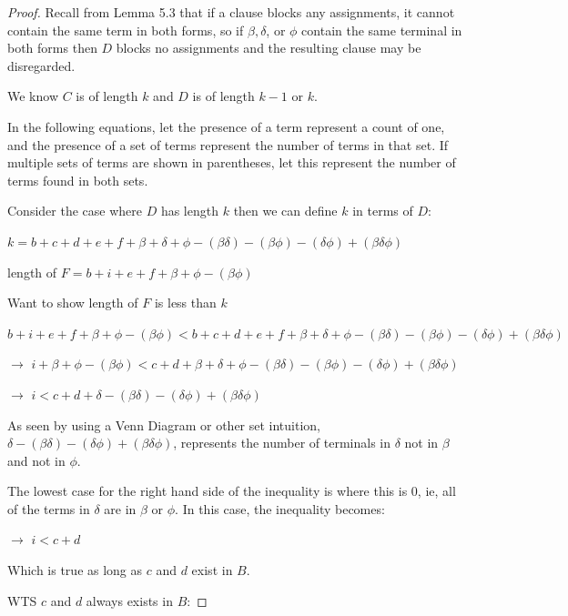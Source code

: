 \documentclass[manuscript]{acmart}
\begin{document}
\begin{proof}
        Recall from Lemma 5.3 that if a clause blocks any assignments, it cannot
        contain the same term in both forms, so if $\beta, \delta$, or $\phi$ contain
        the same terminal in both forms then $D$ blocks no assignments and the resulting
        clause may be disregarded.

        We know $C$ is of length $k$ and $D$ is of length $k - 1$ or $k$.

        In the following equations, let the presence of a term represent a count of one,
        and the presence of a set of terms represent the number of terms in that set. If
        multiple sets of terms are shown in parentheses, let this represent the number
        of terms found in both sets.

        Consider the case where $D$ has length $k$ then we can define $k$ in terms of $D$:
        
        $k = b + c + d + e + f + \beta + \delta + \phi - (\beta \delta) - 
        (\beta \phi) - (\delta \phi) + (\beta \delta \phi)$

        length of $F = b + i + e + f + \beta + \phi - (\beta \phi)$

        Want to show length of $F$ is less than $k$

        $b + i + e + f + \beta + \phi - (\beta \phi) < 
        b + c + d + e + f + \beta + \delta + \phi - (\beta \delta) - 
        (\beta \phi) - (\delta \phi) + (\beta \delta \phi)$

        $\rightarrow$ $i + \beta + \phi - (\beta \phi) < 
        c + d + \beta + \delta + \phi - (\beta \delta) - 
        (\beta \phi) - (\delta \phi) + (\beta \delta \phi)$

        $\rightarrow$ $i < 
        c + d + \delta - (\beta \delta) - (\delta \phi) + (\beta \delta \phi)$

        As seen by using a Venn Diagram or other set intuition, $\delta - 
        (\beta \delta) - (\delta \phi) + (\beta \delta \phi)$, 
        represents the number of terminals in $\delta$ not in $\beta$
        and not in $\phi$.

        The lowest case for the right hand side of the inequality is where 
        this is 0, ie, all of the terms in $\delta$ are in $\beta$ or 
        $\phi$. In this case, the inequality becomes:

        $\rightarrow$ $i < c + d$

        Which is true as long as $c$ and $d$ exist in $B$.

        WTS $c$ and $d$ always exists in $B$:


\end{proof}
\end{document}
